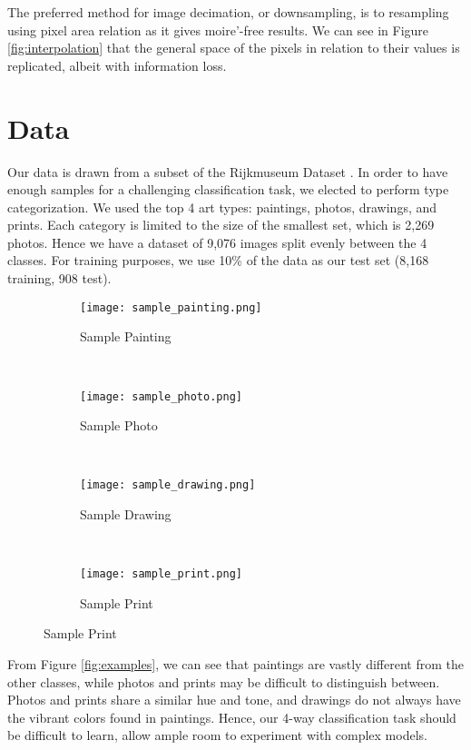 \documentclass{article}
\begin{document}
The preferred method for image decimation, or downsampling, is to
resampling using pixel area relation as it gives moire'-free results. We can
see in Figure \ref{fig:interpolation} that the general space of the pixels in
relation to their values is replicated, albeit with information loss.



\section{Data}
\label{sec:data}
Our data is drawn from a subset of the Rijkmuseum Dataset \cite{Rijksmuseum}.
In order to have enough samples for a challenging classification task, we
elected to perform type categorization. We used the top 4 art types: paintings,
photos, drawings, and prints. Each category is limited to the size of the
smallest set, which is 2,269 photos. Hence we have a dataset of 9,076 images
split evenly between the 4 classes. For training purposes, we use 10\% of the
data as our test set (8,168 training, 908 test).

 \begin{figure}
   \caption{Class Examples}
   \label{fig:examples}
   \begin{subfigure}[b]{0.23\textwidth}
     \centering
     \texttt{[image: sample\_painting.png]}
     \caption{Sample Painting}
     \label{fig:painting}
   \end{subfigure}
   ~
   \begin{subfigure}[b]{0.23\textwidth}
     \centering
     \texttt{[image: sample\_photo.png]}
     \caption{Sample Photo}
     \label{fig:photo}
   \end{subfigure}
   ~
   \begin{subfigure}[b]{0.23\textwidth}
     \centering
     \texttt{[image: sample\_drawing.png]}
     \caption{Sample Drawing}
     \label{fig:drawing}
   \end{subfigure}
   ~
   \begin{subfigure}[b]{0.23\textwidth}
     \centering
     \texttt{[image: sample\_print.png]}
     \caption{Sample Print}
     \label{fig:print}
   \end{subfigure}
 \end{figure}

From Figure \ref{fig:examples}, we can see that paintings are vastly different
from the other classes, while photos and prints may be difficult to distinguish
between. Photos and prints share a similar hue and tone, and drawings do not
always have the vibrant colors found in paintings. Hence, our 4-way
classification task should be difficult to learn, allow ample room to experiment
with complex models.
\end{document}
